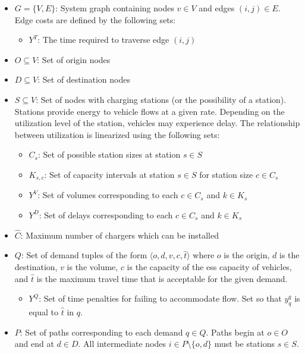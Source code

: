 \documentclass[12pt]{article}
\begin{document}
\begin{itemize}
	\item $G = \{V, E\}$: System graph containing nodes $v \in V$ and edges $(i, j) \in E$. Edge costs are defined by the following sets: \begin{itemize}
		\item $Y^T$: The time required to traverse edge $(i, j)$
	\end{itemize}
	\item $O \subseteq V$: Set of origin nodes
	\item $D \subseteq V$: Set of destination nodes
	\item $S \subseteq V$: Set of nodes with charging stations (or the possibility of a station). Stations provide energy to vehicle flows at a given rate. Depending on the utilization level of the station, vehicles may experience delay. The relationship between utilization is linearized using the following sets: \begin{itemize}
		\item $C_s$: Set of possible station sizes at station $s \in S$
		\item $K_{s, c}$: Set of capacity intervals at station $s \in S$ for station size $c \in C_s$
		\item $Y^V$: Set of volumes corresponding to each $c \in C_s$ and $k \in K_s$
		\item $Y^D$: Set of delays corresponding to each $c \in C_s$ and $k \in K_s$ 
	\end{itemize}
	\item $\hat{C}$: Maximum number of chargers which can be installed
	\item $Q$: Set of demand tuples of the form $\langle o, d, v, c, \hat{t} \rangle$ where $o$ is the origin, $d$ is the destination, $v$ is the volume, $c$ is the capacity of the \gls{ess} capacity of vehicles, and $\hat{t}$ is the maximum travel time that is acceptable for the given demand. \begin{itemize}
		\item $Y^Q$: Set of time penalties for failing to accommodate flow. Set so that $y^q_q$ is equal to $\hat{t}$ in $q$.
	\end{itemize}
	\item $P$: Set of paths corresponding to each demand $q \in Q$. Paths begin at $o \in O$ and end at $d \in D$. All intermediate nodes $i \in P \setminus \{o, d\}$ must be stations $s \in S$.\begin{itemize}

\end{itemize}
\end{itemize}
\end{document}
